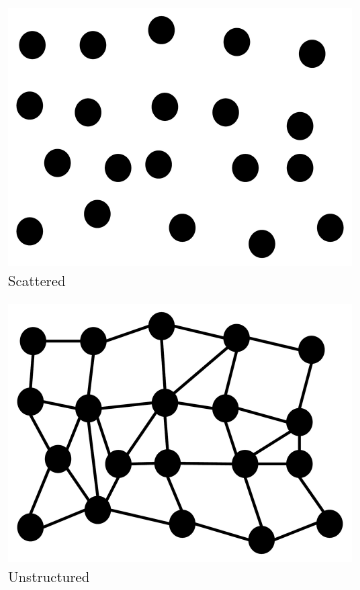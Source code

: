 \begin{figure}
  \begin{subfigure}[b]{0.19\textwidth}
    \includegraphics[width=\textwidth]{Images/scattered.pdf}
    \caption{Scattered}
    \label{fig:scattered}
  \end{subfigure}
  \begin{subfigure}[b]{0.2\textwidth}
    \includegraphics[width=\textwidth]{Images/unstructured.pdf}
    \caption{Unstructured}
    \label{fig:unstructured}
  \end{subfigure}
  \begin{subfigure}[b]{0.2\textwidth}

\end{subfigure}
\end{figure}
